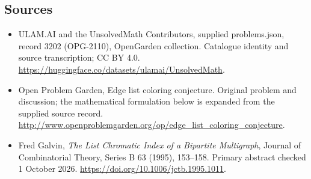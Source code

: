 \documentclass[11pt,a4paper]{article}
\begin{document}
\subsection{Sources}
\begin{itemize}
\item[S1] ULAM.AI and the UnsolvedMath Contributors, supplied problems.json, record 3202 (OPG-2110), OpenGarden collection. Catalogue identity and source transcription; CC BY 4.0.
\url{https://huggingface.co/datasets/ulamai/UnsolvedMath}.
\item[S2] Open Problem Garden, Edge list coloring conjecture. Original problem and discussion; the mathematical formulation below is expanded from the supplied source record.
\url{http://www.openproblemgarden.org/op/edge_list_coloring_conjecture}.
\item[R1] Fred Galvin, \emph{The List Chromatic Index of a Bipartite
Multigraph}, Journal of Combinatorial Theory, Series B 63 (1995), 153--158.
Primary abstract checked 1 October 2026.
\url{https://doi.org/10.1006/jctb.1995.1011}.
\end{itemize}
\end{document}
